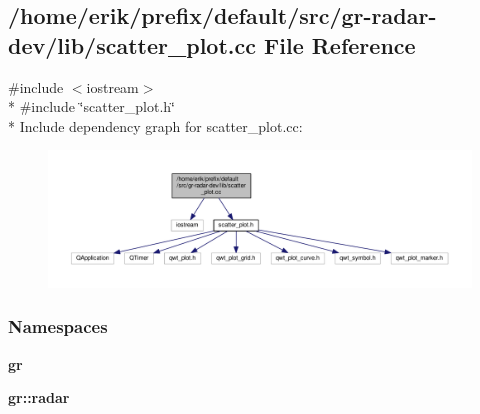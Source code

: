 \subsection{/home/erik/prefix/default/src/gr-\/radar-\/dev/lib/scatter\+\_\+plot.cc File Reference}
\label{scatter__plot_8cc}
{\ttfamily \#include $<$iostream$>$}\\*
{\ttfamily \#include \char`\"{}scatter\+\_\+plot.\+h\char`\"{}}\\*
Include dependency graph for scatter\+\_\+plot.\+cc\+:
\nopagebreak
\begin{figure}[H]
\begin{center}
\leavevmode
\includegraphics[width=350pt]{d6/d99/scatter__plot_8cc__incl}
\end{center}
\end{figure}
\subsubsection*{Namespaces}
\begin{DoxyCompactItemize}
\item 
 {\bf gr}
\item 
 {\bf gr\+::radar}
\end{DoxyCompactItemize}
